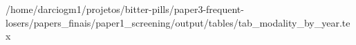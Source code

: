 /home/darciogm1/projetos/bitter-pills/paper3-frequent-losers/papers_finais/paper1_screening/output/tables/tab_modality_by_year.tex